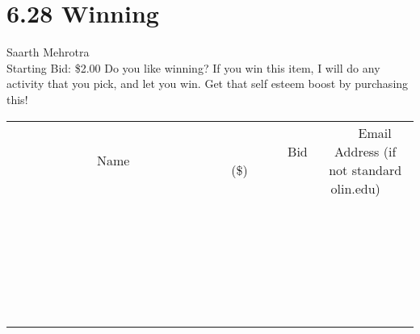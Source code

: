 \documentclass[11pt]{article}
\begin{document}
\section*{6.28 Winning}
Saarth Mehrotra
\\
Starting Bid: \$2.00
\newline
Do you like winning? If you win this item, I will do any activity that you pick, and let you win. Get that self esteem boost by purchasing this!
\\[6ex]
\begin{tabular}{c c c}
~~~~~~~~~~~~~Name~~~~~~~~~~~~~ & ~~~~~~~~~Bid (\$)~~~~~~~~~  & ~~~Email Address (if not standard olin.edu)~~~\\
 & & \\
\hline
 & & \\
\hline
 & & \\
\hline
 & & \\
\hline
 & & \\
\hline
 & & \\
\hline
 & & \\
\hline
 & & \\
\hline
 & & \\
\hline
 & & \\
\hline
 & & \\
\hline
 & & \\
\hline
 & & \\
\hline
 & & \\
\hline
 & & \\
\hline
 & & \\
\hline
 & & \\
\hline
 & & \\
\hline
 & & \\
\hline
 & & \\
\hline
 & & \\
\hline
 & & \\
\hline
 & & \\
\hline
 & & \\
\hline
 & & \\
\hline
 & & \\
\hline
\end{tabular}
\newpage
\end{document}
